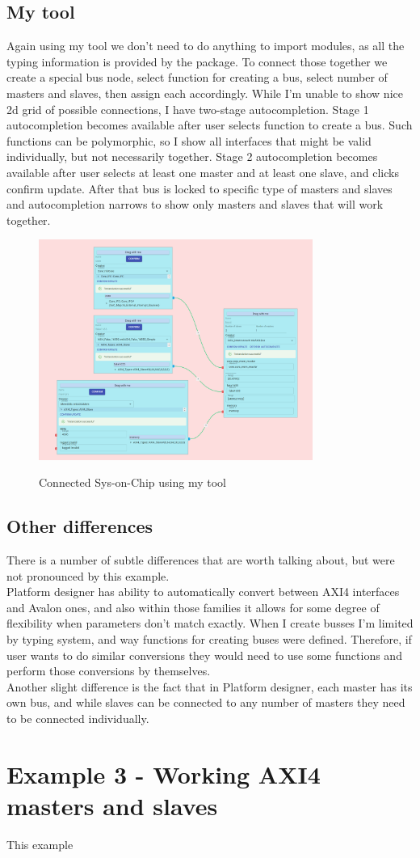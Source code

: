 \documentclass[14pt]{report}
\begin{document}
\subsection{My tool}
Again using my tool we don't need to do anything to import modules, as all the typing information is provided by the package. To connect those together we create a special bus node, select function for creating a bus, select number of masters and slaves, then assign each accordingly. While I'm unable to show nice 2d grid of possible connections, I have two-stage autocompletion. Stage 1 autocompletion becomes available after user selects function to create a bus. Such functions can be polymorphic, so I show all interfaces that might be valid individually, but not necessarily together. Stage 2 autocompletion becomes available after user selects at least one master and at least one slave, and clicks confirm update. After that bus is locked to specific type of masters and slaves and autocompletion narrows to show only masters and slaves that will work together.
\begin{figure}
    \caption{Connected Sys-on-Chip using my tool}
    \includegraphics[width=0.8\textwidth]{images/Example2MySolution.png} \\
    \centering
\end{figure}

\subsection{Other differences}
There is a number of subtle differences that are worth talking about, but were not pronounced by this example.
\\
Platform designer has ability to automatically convert between AXI4 interfaces and Avalon ones, and also within those families it allows for some degree of flexibility when parameters don't match exactly.
When I create busses I'm limited by typing system, and way functions for creating buses were defined. Therefore, if user wants to do similar conversions they would need to use some functions and perform those conversions by themselves.
\\
Another slight difference is the fact that in Platform designer, each master has its own bus, and while slaves can be connected to any number of masters they need to be connected individually. 
\section{Example 3 - Working AXI4 masters and slaves}
This example 
\end{document}
